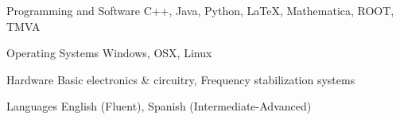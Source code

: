 

\begin{cvskills}

    \cvskill
        {Programming and Software} %
        {C++, Java, Python, \LaTeX, Mathematica, ROOT, TMVA} %

\cvskill
{Operating Systems} %
{Windows, OSX, Linux}

\cvskill
{Hardware} %
{Basic electronics \& circuitry, Frequency stabilization systems} %

  \cvskill
    {Languages} %
{English (Fluent), Spanish (Intermediate-Advanced)} %

\end{cvskills}
